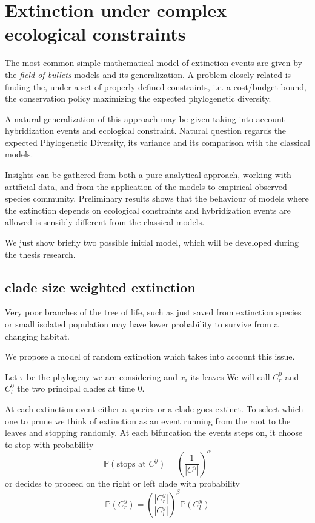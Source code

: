 \documentclass[12pt,a4paper]{report}
\begin{document}
\section{Extinction under complex ecological constraints}

The most common simple mathematical model of extinction events are given by the \emph{field of bullets} models and its generalization. A problem closely related is finding the, under a set of properly defined constraints, i.e. a cost/budget bound, the conservation policy maximizing the expected phylogenetic diversity.

A natural generalization of this approach may be given taking into account hybridization events and ecological constraint. Natural question regards the expected Phylogenetic Diversity, its variance and its comparison with the classical models.

Insights can be gathered from both a pure analytical approach, working with artificial data, and from the application of the models to empirical observed species community. Preliminary results shows that the behaviour of models where the extinction depends on ecological constraints and hybridization events are allowed is sensibly different from the classical models.

We just show briefly two possible initial model, which will be developed during the thesis research. 

\subsection*{clade size weighted extinction}
Very poor branches of the tree of life, such as just saved from extinction species or small isolated population may have lower probability to survive from a changing habitat.

We propose a model of random extinction which takes into account this issue.

Let $\tau$ be the phylogeny we are considering and $x_i$ its leaves We will call $C^0_r$ and $C^0_l$ the two principal clades at time $0$.

At each extinction event either a species or a clade goes extinct. To select which one to prune we think of extinction as an event running from the root to the leaves and stopping randomly. At each bifurcation the events steps on, it choose to stop with probability
$$\mathbb{P}(\mbox{stops at }C^y)=\left(\frac{1}{|C^y|}\right)^\alpha$$
or decides to proceed on the right or left clade with probability
$$\mathbb{P}(C^y_r)=\left(\frac{|C^y_r|}{|C^y_l|}\right)^\beta \mathbb{P}(C^y_l)$$
\end{document}
